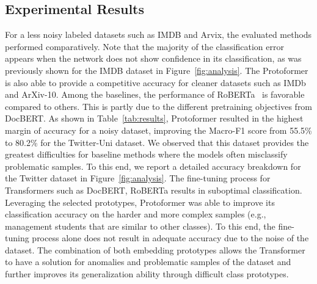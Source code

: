 \documentclass[letterpaper]{article} \usepackage{aaai22}  \usepackage{times}  \usepackage{helvet}  \usepackage{courier}  \usepackage{amsmath,amssymb}
\begin{document}
\subsection{Experimental Results}
For a less noisy labeled datasets such as IMDB and Arvix, the evaluated methods performed comparatively. Note that the majority of the classification error appears when the network does not show confidence in its classification, as was previously shown for the IMDB dataset in Figure~\ref{fig:analysis}. The Protoformer is also able to provide a competitive accuracy for cleaner datasets such as IMDb and ArXiv-10. Among the baselines, the performance of RoBERTa~\cite{liu2019roberta} is favorable compared to others. This is partly due to the different pretraining objectives from DocBERT.
As shown in Table~\ref{tab:results}, Protoformer resulted in the highest margin of accuracy for a noisy dataset, improving the Macro-F1 score from 55.5\% to 80.2\% for the Twitter-Uni dataset. We observed that this dataset provides the greatest difficulties for baseline methods where the models often misclassify problematic samples. To this end, we report a detailed accuracy breakdown for the Twitter dataset in Figure~\ref{fig:analysis}. The fine-tuning process for Transformers such as DocBERT, RoBERTa results in suboptimal classification.
Leveraging the selected prototypes, Protoformer was able to improve its classification accuracy on the harder and more complex samples (e.g., management students that are similar to other classes).
To this end, the fine-tuning process alone does not result in adequate accuracy due to the noise of the dataset. The combination of both embedding prototypes allows the Transformer to have a solution for anomalies and problematic samples of the dataset and further improves its generalization ability through difficult class prototypes.
\end{document}
